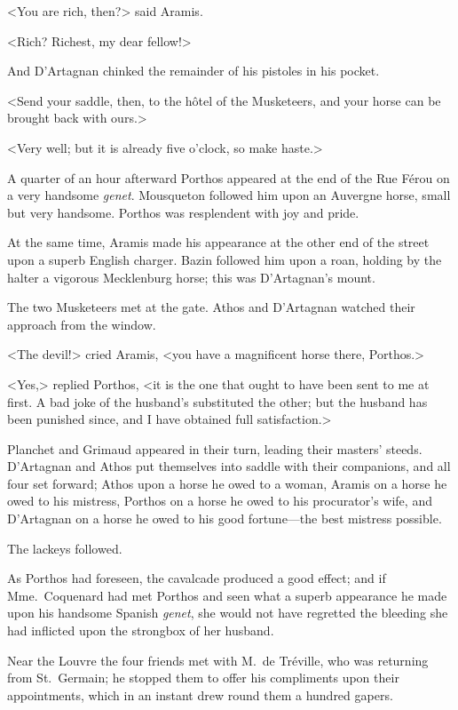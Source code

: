 <You are rich, then?> said Aramis. 

<Rich? Richest, my dear fellow!> 

And D'Artagnan chinked the remainder of his pistoles in his pocket. 

<Send your saddle, then, to the hôtel of the Musketeers, and your horse can be brought back with ours.> 

<Very well; but it is already five o'clock, so make haste.> 

A quarter of an hour afterward Porthos appeared at the end of the Rue Férou on a very handsome \textit{genet}. Mousqueton followed him upon an Auvergne horse, small but very handsome. Porthos was resplendent with joy and pride. 

At the same time, Aramis made his appearance at the other end of the street upon a superb English charger. Bazin followed him upon a roan, holding by the halter a vigorous Mecklenburg horse; this was D'Artagnan's mount. 

The two Musketeers met at the gate. Athos and D'Artagnan watched their approach from the window. 

<The devil!> cried Aramis, <you have a magnificent horse there, Porthos.> 

<Yes,> replied Porthos, <it is the one that ought to have been sent to me at first. A bad joke of the husband's substituted the other; but the husband has been punished since, and I have obtained full satisfaction.> 

Planchet and Grimaud appeared in their turn, leading their masters' steeds. D'Artagnan and Athos put themselves into saddle with their companions, and all four set forward; Athos upon a horse he owed to a woman, Aramis on a horse he owed to his mistress, Porthos on a horse he owed to his procurator's wife, and D'Artagnan on a horse he owed to his good fortune—the best mistress possible. 

The lackeys followed. 

As Porthos had foreseen, the cavalcade produced a good effect; and if Mme.~Coquenard had met Porthos and seen what a superb appearance he made upon his handsome Spanish \textit{genet}, she would not have regretted the bleeding she had inflicted upon the strongbox of her husband. 

Near the Louvre the four friends met with M.~de Tréville, who was returning from St.~Germain; he stopped them to offer his compliments upon their appointments, which in an instant drew round them a hundred gapers. 

